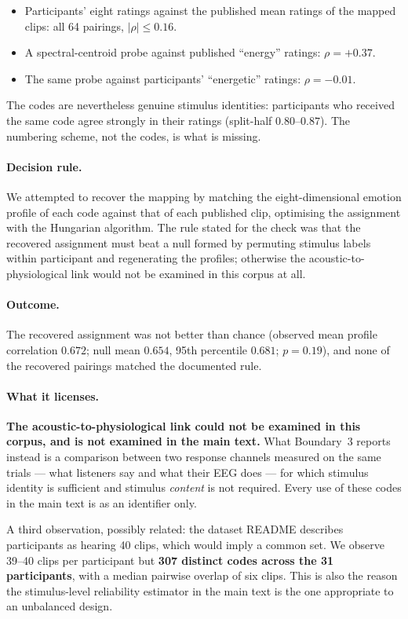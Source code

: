 \begin{itemize}
\item Participants' eight ratings against the published mean ratings of the mapped
clips: all 64 pairings, $|\rho| \le 0.16$.
\item A spectral-centroid probe against published ``energy'' ratings:
$\rho = +0.37$.
\item The same probe against participants' ``energetic'' ratings:
$\rho = -0.01$.
\end{itemize}

The codes are nevertheless genuine stimulus identities: participants who received
the same code agree strongly in their ratings (split-half $0.80$--$0.87$). The
numbering scheme, not the codes, is what is missing.

\paragraph{Decision rule.}
We attempted to recover the mapping by matching the eight-dimensional emotion profile
of each code against that of each published clip, optimising the assignment with the
Hungarian algorithm. The rule stated for the check was that the recovered assignment must
beat a null formed by permuting stimulus labels within participant and regenerating
the profiles; otherwise the acoustic-to-physiological link would not be examined in
this corpus at all.

\paragraph{Outcome.}
The recovered assignment was not better than chance (observed mean profile correlation
$0.672$; null mean $0.654$, 95th percentile $0.681$; $p = 0.19$), and none of the
recovered pairings matched the documented rule.

\paragraph{What it licenses.}
\textbf{The acoustic-to-physiological link could not be examined in this corpus, and
is not examined in the main text.} What Boundary~3 reports instead is a comparison
between two response channels measured on the same trials --- what listeners say and
what their EEG does --- for which stimulus identity is sufficient and stimulus
\emph{content} is not required. Every use of these codes in the main text is as an
identifier only.

A third observation, possibly related: the dataset README describes participants as
hearing 40 clips, which would imply a common set. We observe 39--40 clips per
participant but \textbf{307 distinct codes across the 31 participants}, with a
median pairwise overlap of six clips. This is also the reason the stimulus-level
reliability estimator in the main text is the one appropriate to an unbalanced
design.

